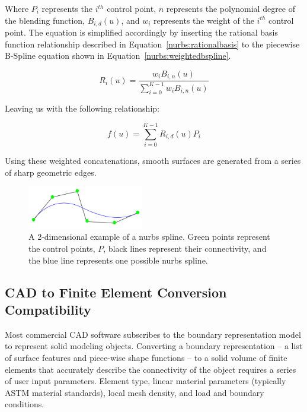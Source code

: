 \documentclass[12pt]{drexelthesis}
\let\Oldsubsection\subsection
\renewcommand{\subsection}{\FloatBarrier\Oldsubsection}
\begin{document}
 Where $P_{i}$ represents the $i^{th}$ control point, $n$ represents the polynomial degree of the blending function, $B_{i,d}(u)$, and $w_{i}$ represents the weight of the $i^{th}$ control point. The equation is simplified accordingly by inserting the rational basis function relationship described in Equation~\ref{nurbs:rationalbasis} to the piecewise B-Spline equation shown in Equation~\ref{nurbs:weightedbspline}.
 
\begin{equation}
	R_{i}(u) = \frac    {   w_{i} B_{i,n}(u)}
				 		{  \sum_{i=0}^{K-1} w_{i} B_{i,n}(u) }
	\label{nurbs:rationalbasis}
 \end{equation}
 
 Leaving us with the following relationship:
 
 \begin{equation}
 	f(u) = \sum_{i=0}^{K-1} R_{i,d}(u) P_{i}
\end{equation}

Using these weighted concatenations, smooth surfaces are generated from a series of sharp geometric edges.


\begin{figure}[!ht]
	\centering
		\includegraphics[width=2in]{cadTypes/nurbs.png}
	\caption[Example of a 2-dimensional nurbs spline.]{\centering A 2-dimensional example of a nurbs spline. Green points represent the control points, $P$, black lines represent their connectivity, and the blue line represents one possible nurbs spline.}
\end{figure}


\subsection{CAD to Finite Element Conversion Compatibility}
Most commercial CAD software subscribes to the boundary representation model to represent solid modeling objects. Converting a boundary representation -- a list of surface features and piece-wise shape functions --  to a solid volume of finite elements that accurately describe the connectivity of the object requires a series of user input parameters. Element type, linear material parameters (typically ASTM material standards), local mesh density, and load and boundary conditions.
\end{document}
